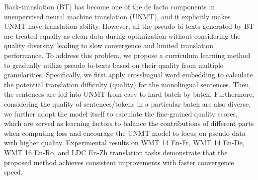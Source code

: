 Back-translation (BT) has become one of the de facto components in unsupervised neural machine translation (UNMT), and it explicitly makes UNMT have translation ability. However, all the pseudo bi-texts generated by BT are treated equally as clean data during optimization without considering the quality diversity, leading to slow convergence and limited translation performance. To address this problem, we propose a curriculum learning method to gradually utilize pseudo bi-texts based on their quality from multiple granularities. Specifically, we first apply crosslingual word embedding to calculate the potential translation difficulty (quality) for the monolingual sentences. Then, the sentences are fed into UNMT from easy to hard batch by batch. Furthermore, considering the quality of sentences/tokens in a particular batch are also diverse, we further adopt the model itself to calculate the fine-grained quality scores, which are served as learning factors to balance the contributions of different parts when computing loss and encourage the UNMT model to focus on pseudo data with higher quality.  Experimental results on WMT 14 En-Fr, WMT 14 En-De, WMT 16 En-Ro, and LDC En-Zh translation tasks demonstrate that the proposed method achieves consistent improvements with faster convergence speed.
